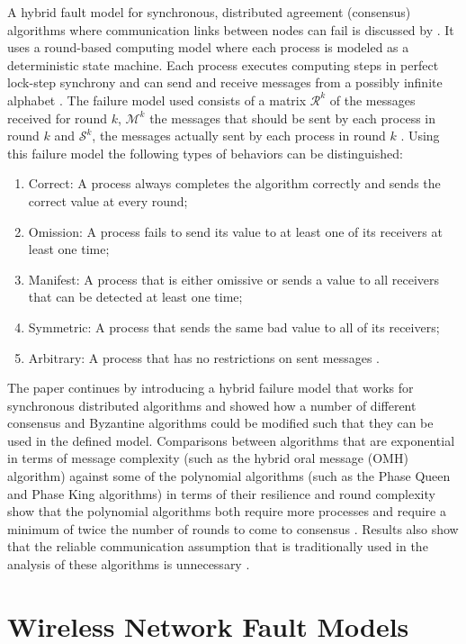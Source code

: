 \documentclass[twoside, conference]{IEEEtran}
\begin{document}
A hybrid fault model for synchronous, distributed agreement (consensus) algorithms where communication links between nodes can fail is discussed by \cite{Biely2011}.  It uses a round-based computing model where each process is modeled as a deterministic state machine.  Each process executes computing steps in perfect lock-step synchrony and can send and receive messages from a possibly infinite alphabet \cite{Biely2011}.  The failure model used consists of a matrix $\mathcal{R}^k$ of the messages received for round $k$, $\mathcal{M}^k$ the messages that should be sent by each process in round $k$ and $\mathcal{S}^k$, the messages actually sent by each process in round $k$ \cite{Biely2011}.  Using this failure model the following types of behaviors can be distinguished:
\begin{enumerate}
	\item Correct: A process always completes the algorithm correctly and sends the correct value at every round;
	\item Omission: A process fails to send its value to at least one of its receivers at least one time;
	\item Manifest: A process that is either omissive or sends a value to all receivers that can be detected at least one time;
	\item Symmetric: A process that sends the same bad value to all of its receivers;
	\item Arbitrary: A process that has no restrictions on sent messages \cite{Biely2011}.
\end{enumerate}
The paper continues by introducing a hybrid failure model that works for synchronous distributed algorithms \cite{Biely2011} and showed how a number of different consensus and Byzantine algorithms could be modified such that they can be used in the defined model.  Comparisons between algorithms that are exponential in terms of message complexity (such as the hybrid oral message (OMH) algorithm) against some of the polynomial algorithms (such as the Phase Queen and Phase King algorithms) in terms of their resilience and round complexity show that the polynomial algorithms both require more processes and require a minimum of twice the number of rounds to come to consensus \cite{Biely2011}.  Results also show that the reliable communication assumption that is traditionally used in the analysis of these algorithms is unnecessary \cite{Biely2011}.

\section{Wireless Network Fault Models}\label{sec:wireless-faultmodels}
\end{document}
